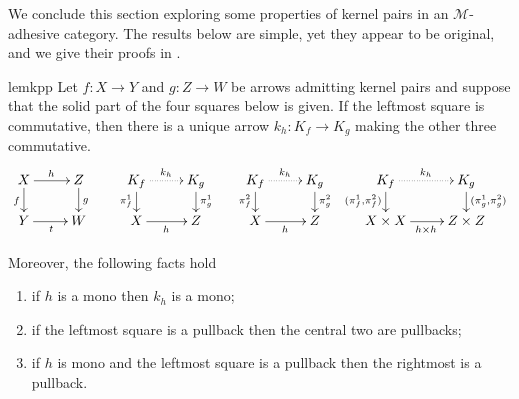 \documentclass[3p]{elsarticle}
\def\D{\textbf {\textup{D}}}
\def\X{\textbf {\textup{X}}}
\newcommand{\commentato}[1]{ {} }
\theoremstyle{remark}
\theoremstyle{definition}
\begin{document}
\commentato{ 
\begin{restatable}{cor}{natepi}\label{cor:reg_epi_components_reg_epi_nat_trans}
    Let $\X$ be a category with pullbacks and $\phi\colon F \to G$ a natural transformation between functors $F, G: \D \rightrightarrows \X$. If $\phi_d$ is a regular epi for every $d$, then $\phi$ is a regular epi.
\end{restatable}

From the previous result we deduce that the class of regular epis is closed under colimits.

\begin{restatable}{lem}{epicol}\label{lemma:nat_trans_reg_epi_canonical_arrow_reg_epi}
    Let $F,G\colon \D\rightrightarrows \X$ be two diagrams, and suppose that $\X$ has all colimits of shape $\D$. Let $(X, \{x_d\}_{d \in \D})$ and $(Y, \{y_d\}_{d\in D})$ be the colimits of $F$ and $G$, respectively.  If $\phi\colon  F \to G$ is a natural transformation whose components are regular epis, then the arrow induced by $\phi$ from $X$ to $Y$ is a regular epi.
\end{restatable}
}
We conclude this section exploring some properties of kernel pairs in an $\mathcal{M}$-adhesive category. 
The results below are simple, yet they appear to be original, and we give their proofs in .

\begin{restatable}{lem}{kpp}\label{lemma:kern_pairs_pres_pullbacks}
	Let $f\colon X \to Y$ and $g\colon Z \to W$ be arrows admitting kernel pairs and suppose that the solid part of the four squares below is given. 
	If the leftmost square is commutative, then there is a unique arrow $k_h\colon K_f \to K_g$ making the other three commutative.
	\[\xymatrix@R=15pt{X \ar[r]^{h}\ar[d]_{f}& Z \ar[d]^{g} & K_f \ar@{.>}[r]^{k_h} \ar[d]_{\pi^1_f}& K_g \ar[d]^{\pi^1_g} & K_f  \ar@{.>}[r]^{k_h} \ar[d]_{\pi^2_f}& K_g \ar[d]^{\pi^2_g}& K_f  \ar@{.>}[r]^{k_h} \ar[d]_{(\pi^1_f,\pi^2_f)} & K_g \ar[d]^{(\pi^1_g, \pi^2_g)}\\ Y \ar[r]_t& W & X \ar[r]_{h} & Z & X\ar[r]_{h} &Z & X\times X \ar[r]_{h\times h}& Z\times Z}\]
	
		Moreover, the following facts hold
		\begin{enumerate}
			\item if $h$ is a mono then $k_h$ is a mono;
			\item if the leftmost square is a pullback then the central two are pullbacks;
			\item if $h$ is mono and the leftmost square is a pullback then the rightmost is a pullback.
		\end{enumerate} 
\end{restatable}
\end{document}
